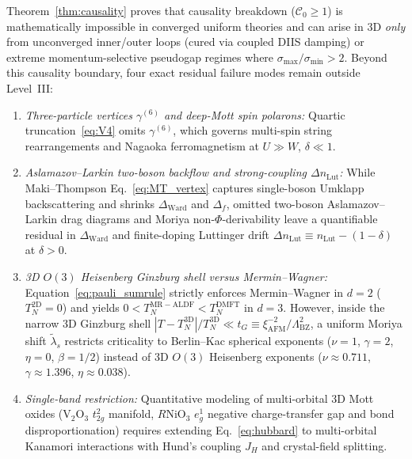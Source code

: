 \documentclass[11pt,a4paper]{article}
\numberwithin{equation}{section}
\theoremstyle{plain}
\theoremstyle{definition}
\begin{document}
Theorem~\ref{thm:causality} proves that causality breakdown ($\mathcal{C}_0 \ge 1$) is
mathematically impossible in converged uniform theories and can arise in 3D \emph{only}
from unconverged inner/outer loops (cured via coupled DIIS damping) or extreme
momentum-selective pseudogap regimes where $\sigma_{\max}/\sigma_{\min} > 2$. Beyond
this causality boundary, four exact residual failure modes remain outside Level~III:
\begin{enumerate}
    \item \emph{Three-particle vertices $\gamma^{(6)}$ and deep-Mott spin polarons:}
    Quartic truncation~\eqref{eq:V4} omits $\gamma^{(6)}$, which governs multi-spin
    string rearrangements and Nagaoka ferromagnetism at $U \gg W$, $\delta \ll 1$.
    \item \emph{Aslamazov--Larkin two-boson backflow and strong-coupling $\Delta n_{\mathrm{Lut}}$:}
    While Maki--Thompson Eq.~\eqref{eq:MT_vertex} captures single-boson Umklapp
    backscattering and shrinks $\Delta_{\mathrm{Ward}}$ and $\Delta_f$, omitted
    two-boson Aslamazov--Larkin drag diagrams and Moriya non-$\Phi$-derivability leave
    a quantifiable residual in $\Delta_{\mathrm{Ward}}$ and finite-doping Luttinger
    drift $\Delta n_{\mathrm{Lut}} \equiv n_{\mathrm{Lut}} - (1 - \delta)$ at $\delta > 0$.
    \item \emph{3D $O(3)$ Heisenberg Ginzburg shell versus Mermin--Wagner:}
    Equation~\eqref{eq:pauli_sumrule} strictly enforces Mermin--Wagner in $d = 2$
    ($T_N^{\mathrm{2D}} = 0$) and yields $0 < T_N^{\mathrm{MR-ALDF}} < T_N^{\mathrm{DMFT}}$
    in $d = 3$. However, inside the narrow 3D Ginzburg shell
    $|T - T_N^{\mathrm{3D}}|/T_N^{\mathrm{3D}} \ll t_G \equiv \xi_{\mathrm{AFM}}^{-2}/\Lambda_{\mathrm{BZ}}^2$,
    a uniform Moriya shift $\tilde{\lambda}_s$ restricts criticality to Berlin--Kac
    spherical exponents ($\nu = 1$, $\gamma = 2$, $\eta = 0$, $\beta = 1/2$) instead of
    3D $O(3)$ Heisenberg exponents ($\nu \approx 0.711$, $\gamma \approx 1.396$,
    $\eta \approx 0.038$).
    \item \emph{Single-band restriction:} Quantitative modeling of multi-orbital 3D
    Mott oxides ($\mathrm{V}_2\mathrm{O}_3$ $t_{2g}^2$ manifold, $R\mathrm{NiO}_3$
    $e_g^1$ negative charge-transfer gap and bond disproportionation) requires extending
    Eq.~\eqref{eq:hubbard} to multi-orbital Kanamori interactions with Hund's coupling
    $J_H$ and crystal-field splitting.
\end{enumerate}
\end{document}
